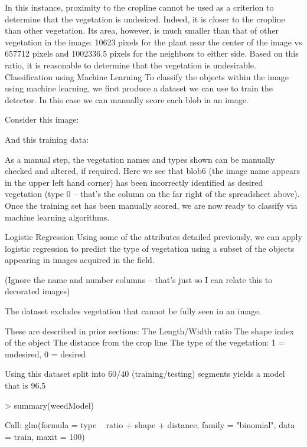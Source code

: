 \documentclass[letterpaper]{article}
\begin{document}
In this instance, proximity to the cropline cannot be used as a criterion to determine that the vegetation is undesired. Indeed, it is closer to the cropline than other vegetation. Its area, however, is much smaller than that of other vegetation in the image: 10623 pixels for the plant near the center of the image vs 657712 pixels and 1002336.5 pixels for the neighbors to either side.
Based on this ratio, it is reasonable to determine that the vegetation is undesirable.
Classification using Machine Learning
To classify the objects within the image using machine learning, we first produce a dataset we can use to train the detector. In this case we can manually score each blob in an image.

Consider this image:



And this training data:



As a manual step, the vegetation names and types shown can be manually checked and altered, if required. Here we see that blob6 (the image name appears in the upper left hand corner) has been incorrectly identified as desired vegetation (type 0 -- that’s the column on the far right of the spreadsheet above). Once the training set has been manually scored, we are now ready to classify via machine learning algorithms.


Logistic Regression
Using some of the attributes detailed previously, we can apply logistic regression to predict the type of vegetation using a subset of the objects appearing in images acquired in the field.




(Ignore the name and number columns -- that’s just so I can relate this to decorated images)

The dataset excludes vegetation that cannot be fully seen in an image.

These are described in prior sections:
The Length/Width ratio
The shape index of the object
The distance from the crop line
The type of the vegetation: 1 = undesired, 0 = desired

Using this dataset split into 60/40 (training/testing) segments yields a model that is 96.5 %

> summary(weedModel)

Call:
glm(formula = type ~ ratio + shape + distance, family = "binomial", 
    data = train, maxit = 100)
\end{document}
